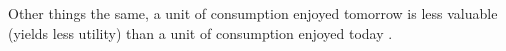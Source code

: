 \documentclass[
thesis.tex
]{subfiles}
\begin{document}
\begin{comment}
	
	
	\begin{definition}[Household Maximization Problem]
		{\singlespacing
			The utility function is:
			\begin{itemize}
				\item strictly increasing in consumption $C$;
				\item strictly increasing in leisure $l$;
				\item strictly concave;
				\item twice continuously differentiable;
				\item the composite consumption good $C$ is also the numeraire good, so that its price equals one: $p_C=1$;
				\item to avoid corner solutions, the Inada conditions\footnotemark{} hold. \footnotetext{see definition \ref{def:Inada Condition}.}
		\end{itemize}}
		
		Consider a representative household that maximizes an utility function $u$ that depends on consumption $C_t$ and labor $L_t$:
		\begin{align}
			u \equiv u \left( C_t, L_t \right)
		\end{align}
		
		The utility function is considered to be convex (when a variable increases, the respective marginal utility diminishes)\footnotemark{}: \footnotetext{Consider the following notation: given two variables $X$ and $Y$, the first and second partial derivatives are: $Y_X := \displaystyle\frac{\partial Y}{\partial X}$ and $Y_{XX} := \displaystyle\frac{\partial^2 Y}{\partial X^2}$.}
		\begin{align*}
			u_{C} > 0 \text{,}\quad u_{CC} < 0 \text{,}\quad
			u_{L} > 0 \text{,}\quad u_{LL} < 0
		\end{align*}
		
	\end{definition}
	
\end{comment}

\begin{definition}
	
	Other things the same, a unit of consumption enjoyed tomorrow is less valuable (yields less utility) than a unit of consumption enjoyed today \cite[Lecture 2, p.1]{solis-garcia_ucb_2022}.
	
\end{definition}
\end{document}
